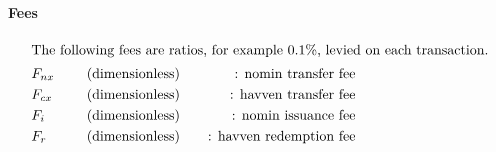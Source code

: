 \paragraph{Fees}
\begin{align*}
\intertext{The following fees are ratios, for example 0.1\%, levied on each transaction.}
&F_{nx} & \ && &\text{(dimensionless)} && &\text{: nomin transfer fee} \\
&F_{cx} & \ && &\text{(dimensionless)} && &\text{: havven transfer fee} \\
&F_i & \ && &\text{(dimensionless)} && &\text{: nomin issuance fee} \\
&F_r & \ && &\text{(dimensionless)} && &\text{: havven redemption fee} \\
\end{align*}

\pagebreak

